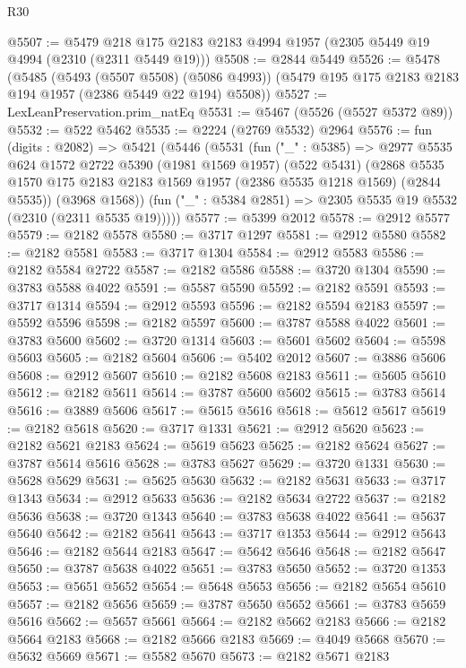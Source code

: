 \begin{lexlean}{R30}
\begin{coremodule}
@5507 := @5479 @218 @175 @2183 @2183 @4994 @1957 (@2305 @5449 @19 @4994 (@2310 (@2311 @5449 @19)))
@5508 := @2844 @5449
@5526 := @5478
    (@5485
      (@5493 (@5507 @5508) (@5086 @4993))
      (@5479 @195 @175 @2183 @2183 @194 @1957 (@2386 @5449 @22 @194) @5508))
@5527 := LexLeanPreservation.prim_natEq
@5531 := @5467 (@5526 (@5527 @5372 @89))
@5532 := @522 @5462
@5535 := @2224 (@2769 @5532) @2964
@5576 := fun (digits : @2082) =>
  @5421
    (@5446
      (@5531
        (fun ("_" : @5385) =>
        @2977
          @5535
          @624
          @1572
          @2722
          @5390
          (@1981 @1569 @1957)
          (@522 @5431)
          (@2868 @5535 @1570 @175 @2183 @2183 @1569 @1957 (@2386 @5535 @1218 @1569) (@2844 @5535))
          (@3968 @1568))
        (fun ("_" : @5384 @2851) => @2305 @5535 @19 @5532 (@2310 (@2311 @5535 @19)))))
@5577 := @5399 @2012
@5578 := @2912 @5577
@5579 := @2182 @5578
@5580 := @3717 @1297
@5581 := @2912 @5580
@5582 := @2182 @5581
@5583 := @3717 @1304
@5584 := @2912 @5583
@5586 := @2182 @5584 @2722
@5587 := @2182 @5586
@5588 := @3720 @1304
@5590 := @3783 @5588 @4022
@5591 := @5587 @5590
@5592 := @2182 @5591
@5593 := @3717 @1314
@5594 := @2912 @5593
@5596 := @2182 @5594 @2183
@5597 := @5592 @5596
@5598 := @2182 @5597
@5600 := @3787 @5588 @4022
@5601 := @3783 @5600
@5602 := @3720 @1314
@5603 := @5601 @5602
@5604 := @5598 @5603
@5605 := @2182 @5604
@5606 := @5402 @2012
@5607 := @3886 @5606
@5608 := @2912 @5607
@5610 := @2182 @5608 @2183
@5611 := @5605 @5610
@5612 := @2182 @5611
@5614 := @3787 @5600 @5602
@5615 := @3783 @5614
@5616 := @3889 @5606
@5617 := @5615 @5616
@5618 := @5612 @5617
@5619 := @2182 @5618
@5620 := @3717 @1331
@5621 := @2912 @5620
@5623 := @2182 @5621 @2183
@5624 := @5619 @5623
@5625 := @2182 @5624
@5627 := @3787 @5614 @5616
@5628 := @3783 @5627
@5629 := @3720 @1331
@5630 := @5628 @5629
@5631 := @5625 @5630
@5632 := @2182 @5631
@5633 := @3717 @1343
@5634 := @2912 @5633
@5636 := @2182 @5634 @2722
@5637 := @2182 @5636
@5638 := @3720 @1343
@5640 := @3783 @5638 @4022
@5641 := @5637 @5640
@5642 := @2182 @5641
@5643 := @3717 @1353
@5644 := @2912 @5643
@5646 := @2182 @5644 @2183
@5647 := @5642 @5646
@5648 := @2182 @5647
@5650 := @3787 @5638 @4022
@5651 := @3783 @5650
@5652 := @3720 @1353
@5653 := @5651 @5652
@5654 := @5648 @5653
@5656 := @2182 @5654 @5610
@5657 := @2182 @5656
@5659 := @3787 @5650 @5652
@5661 := @3783 @5659 @5616
@5662 := @5657 @5661
@5664 := @2182 @5662 @2183
@5666 := @2182 @5664 @2183
@5668 := @2182 @5666 @2183
@5669 := @4049 @5668
@5670 := @5632 @5669
@5671 := @5582 @5670
@5673 := @2182 @5671 @2183

\end{coremodule}
\end{lexlean}
